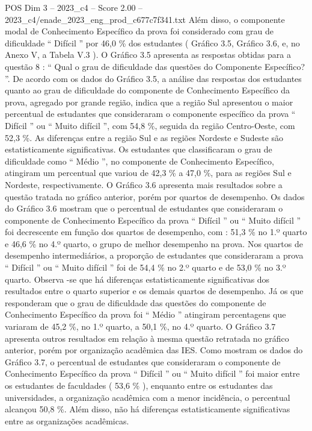 \begin{textsample}{POS Dim 3 – 2023\_c4 – Score 2.00 – 2023\_c4/enade\_2023\_eng\_prod\_c677c7f341.txt}
Além disso, o componente modal de Conhecimento Específico da prova foi considerado com grau de dificuldade “ Difícil ” por 46,0 \% dos estudantes ( Gráfico 3.5, Gráfico 3.6, e, no Anexo V, a Tabela V.3 ).
O Gráfico 3.5 apresenta as respostas obtidas para a questão 8 : “ Qual o grau de dificuldade das questões do Componente Específico? ”.
De acordo com os dados do Gráfico 3.5, a análise das respostas dos estudantes quanto ao grau de dificuldade do componente de Conhecimento Específico da prova, agregado por grande região, indica que a região Sul apresentou o maior percentual de estudantes que consideraram o componente específico da prova “ Difícil ” ou “ Muito difícil ”, com 54,8 \%, seguida da região Centro-Oeste, com 52,3 \%.
As diferenças entre a região Sul e as regiões Nordeste e Sudeste são estatisticamente significativas.
Os estudantes que classificaram o grau de dificuldade como “ Médio ”, no componente de Conhecimento Específico, atingiram um percentual que variou de 42,3 \% a 47,0 \%, para as regiões Sul e Nordeste, respectivamente.
O Gráfico 3.6 apresenta mais resultados sobre a questão tratada no gráfico anterior, porém por quartos de desempenho.
Os dados do Gráfico 3.6 mostram que o percentual de estudantes que consideraram o componente de Conhecimento Específico da prova “ Difícil ” ou “ Muito difícil ” foi decrescente em função dos quartos de desempenho, com : 51,3 \% no 1.º quarto e 46,6 \% no 4.º quarto, o grupo de melhor desempenho na prova.
Nos quartos de desempenho intermediários, a proporção de estudantes que consideraram a prova “ Difícil ” ou “ Muito difícil ” foi de 54,4 \% no 2.º quarto e de 53,0 \% no 3.º quarto.
Observa -se que há diferenças estatisticamente significativas dos resultados entre o quarto superior e os demais quartos de desempenho.
Já os que responderam que o grau de dificuldade das questões do componente de Conhecimento Específico da prova foi “ Médio ” atingiram percentagens que variaram de 45,2 \%, no 1.º quarto, a 50,1 \%, no 4.º quarto.
O Gráfico 3.7 apresenta outros resultados em relação à mesma questão retratada no gráfico anterior, porém por organização acadêmica das IES.
Como mostram os dados do Gráfico 3.7, o percentual de estudantes que consideraram o componente de Conhecimento Específico da prova “ Difícil ” ou “ Muito difícil ” foi maior entre os estudantes de faculdades ( 53,6 \% ), enquanto entre os estudantes das universidades, a organização acadêmica com a menor incidência, o percentual alcançou 50,8 \%.
Além disso, não há diferenças estatisticamente significativas entre as organizações acadêmicas.

\end{textsample}
